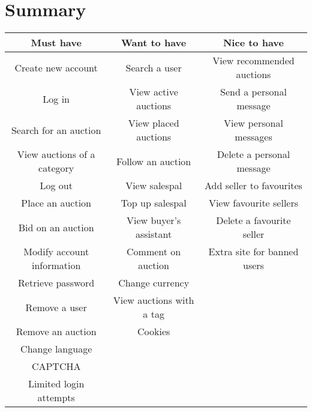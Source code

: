 \section{Summary}
	\begin{tabular}{|c|c|c|}	
		\hline \textbf{Must have} & \textbf{Want to have} & \textbf{Nice to have} \\ 
		\hline  Create new account & Search a user & View recommended auctions \\ 
		\hline  Log in & View active auctions & Send a personal message \\ 
		\hline  Search for an auction & View placed auctions & View personal messages \\
		\hline  View auctions of a category & Follow an auction & Delete a personal message \\ 
		\hline  Log out & View salespal & Add seller to favourites \\ 
		\hline  Place an auction & Top up salespal & View favourite sellers \\ 
		\hline  Bid on an auction & View buyer's assistant &  Delete a favourite seller\\ 
		\hline  Modify account information & Comment on auction & Extra site for banned users \\ 
		\hline  Retrieve password & Change currency &  \\ 
		\hline  Remove a user & View auctions with a tag &  \\ 
		\hline  Remove an auction & Cookies &  \\ 
		\hline  Change language &  &  \\ 
		\hline  CAPTCHA &  &  \\ 
		\hline  Limited login attempts &  &  \\ 
		\hline
	\end{tabular} 
